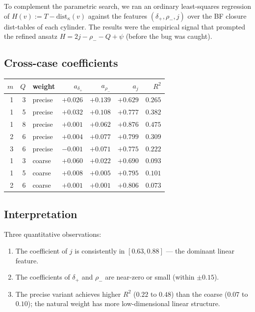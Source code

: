 \documentclass[11pt,a4paper]{article}
\theoremstyle{plain}
\theoremstyle{definition}
\begin{document}
To complement the parametric search, we ran an ordinary least-squares
regression of $H(v) := T - \mathrm{dist}_\kappa(v)$ against the
features $(\delta_+, \rho_-, j)$ over the BF closure dist-tables of
each cylinder. The results were the empirical signal that prompted
the refined ansatz $H = 2j - \rho_- - Q + \psi$ (before the bug
was caught).

\subsection{Cross-case coefficients}

\begin{center}\footnotesize
\begin{tabular}{rrlrrrr}
\toprule
$m$ & $Q$ & weight & $a_{\delta_+}$ & $a_{\rho_-}$ & $a_j$ & $R^2$ \\
\midrule
1 & 3  & precise & $+0.026$ & $+0.139$ & $+0.629$ & $0.265$ \\
1 & 5  & precise & $+0.032$ & $+0.108$ & $+0.777$ & $0.382$ \\
1 & 8  & precise & $+0.001$ & $+0.062$ & $+0.876$ & $0.475$ \\
2 & 6  & precise & $+0.004$ & $+0.077$ & $+0.799$ & $0.309$ \\
3 & 6  & precise & $-0.001$ & $+0.071$ & $+0.775$ & $0.222$ \\
1 & 3  & coarse  & $+0.060$ & $+0.022$ & $+0.690$ & $0.093$ \\
1 & 5  & coarse  & $+0.008$ & $+0.005$ & $+0.795$ & $0.101$ \\
2 & 6  & coarse  & $+0.001$ & $+0.001$ & $+0.806$ & $0.073$ \\
\bottomrule
\end{tabular}
\end{center}

\subsection{Interpretation}

Three quantitative observations:
\begin{enumerate}
  \item The coefficient of $j$ is consistently in
        $[0.63, 0.88]$ — the dominant linear feature.
  \item The coefficients of $\delta_+$ and $\rho_-$ are
        near-zero or small (within $\pm 0.15$).
  \item The precise variant achieves higher $R^2$
        ($0.22$ to $0.48$) than the coarse ($0.07$ to $0.10$);
        the natural weight has more low-dimensional linear
        structure.
\end{enumerate}
\end{document}

